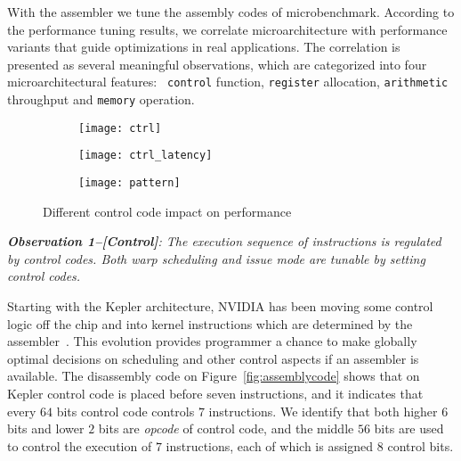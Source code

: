 With the assembler we tune the assembly codes of microbenchmark. According to the performance tuning results, we 
correlate microarchitecture with performance variants that guide optimizations in real applications. The correlation is 
presented as several meaningful observations, which are categorized into four microarchitectural features:  {\tt 
control} function, {\tt register} allocation, {\tt arithmetic} throughput and {\tt memory} operation.
    \begin{figure*}
        \begin{subfigure}[htbp]{0.3\textwidth}
            \texttt{[image: ctrl]}
            \label{fig:control_throughput}
        \end{subfigure}
        \begin{subfigure}[htbp]{0.3\textwidth}
            \texttt{[image: ctrl\_latency]}
            \label{fig:control_latency}
        \end{subfigure}
        \begin{subfigure}[htbp]{0.3\textwidth}
            \texttt{[image: pattern]}
            \label{fig:control_pattern}
        \end{subfigure}
        \caption{Different control code impact on performance}\label{fig:control_code}
    \end{figure*}


{\em {\bf Observation 1--[Control]}: The execution sequence of instructions is regulated by control codes. Both warp 
scheduling and issue mode are tunable by setting control codes.}

Starting with the Kepler architecture, NVIDIA has been moving some control logic off the chip and into kernel 
instructions which are determined by the assembler~\cite{lai,maxas}. This evolution provides programmer a chance to 
make globally optimal decisions on scheduling and other control aspects if an assembler is available. The disassembly 
code on Figure~\ref{fig:assemblycode} shows that on Kepler control code is placed before seven instructions, and it 
indicates that every $64$ bits control code controls $7$ instructions. We identify that both higher $6$ bits and lower 
$2$ bits are {\em opcode} of control code, and the middle $56$ bits are used to control the execution of $7$ 
instructions, each of which is assigned $8$ control bits.

